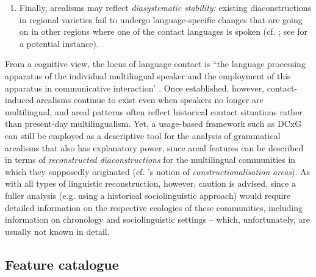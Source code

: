 \documentclass[output=paper]{langsci/langscibook}
\begin{document}
\begin{enumerate}
 \item Finally, arealisms may reflect \textit{diasystematic} \textit{stability:} existing diaconstructions in regional varieties fail to undergo language-specific changes that are going on in other regions where one of the contact languages is spoken (cf. \citealt{KühlBraunmüller2014}; see  for a potential instance).
 
 \end{enumerate}



From a cognitive view, the locus of language contact is “the language processing apparatus of the individual multilingual speaker and the employment of this apparatus in communicative interaction' \citep[3]{Matras.2020}. Once established, however, contact-induced arealisms continue to exist even when speakers no longer are multilingual, and areal patterns often reflect historical contact situations rather than present-day multilingualism. Yet, a usage-based framework such as DCxG can still be employed as a descriptive tool for the analysis of grammatical arealisms that also has explanatory power, since areal features can be described in terms of \textit{reconstructed} \textit{diaconstructions} for the multilingual communities in which they supposedly originated (cf. \citeauthor{Holzl.2018}’s \citeyear{Holzl.2018} notion of \textit{constructionalisation} \textit{areas}). As with all types of linguistic reconstruction, however, caution is advised, since a fuller analysis (e.g. using a historical sociolinguistic approach) would require detailed information on the respective ecologies of these communities, including information on chronology and sociolinguistic settings – which, unfortunately, are usually not known in detail.


 \label{sec:hoeder:4}


 \subsection{Feature catalogue}
 \label{sec:hoeder:4.1}
\end{document}

